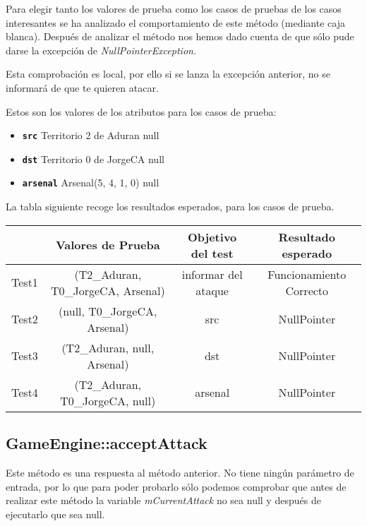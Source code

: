 Para elegir tanto los valores de prueba como los casos de pruebas de los casos interesantes se ha analizado el comportamiento de este método (mediante caja blanca). Después de analizar el método nos hemos dado cuenta de que sólo pude darse la excepción de \textit{NullPointerException}.

Esta comprobación es local, por ello si se lanza la excepción anterior, no se informará de que te quieren atacar.

Estos son los valores de los atributos para los casos de prueba:
\begin{itemize}
\item \textbf{\texttt{src}}
\subitem Territorio 2 de Aduran
\subitem null

\item \textbf{\texttt{dst}}
\subitem Territorio 0 de JorgeCA
\subitem null

\item \textbf{\texttt{arsenal}}
\subitem Arsenal(5, 4, 1, 0)
\subitem null
\end{itemize}

La tabla siguiente recoge los resultados esperados, para los casos de prueba.

{\footnotesize
\begin{longtable}[c]{lccc}
 & \textbf{Valores de Prueba} & \textbf{Objetivo del test} & \textbf{Resultado esperado} \\
\hline \hline
\endhead

Test1 & (T2\_Aduran, T0\_JorgeCA, Arsenal) & informar del ataque & Funcionamiento Correcto\\
Test2 & (null, T0\_JorgeCA, Arsenal) & src & NullPointer\\
Test3 & (T2\_Aduran, null, Arsenal) & dst & NullPointer\\
Test4 & (T2\_Aduran, T0\_JorgeCA, null) & arsenal & NullPointer\\

\hline
\end{longtable}
}

\subsection{GameEngine::acceptAttack}

Este método es una respuesta al método anterior. No tiene ningún parámetro de entrada, por lo que para poder probarlo sólo podemos comprobar que antes de realizar este método la variable \textit{mCurrentAttack} no sea null y después de ejecutarlo que sea null.

